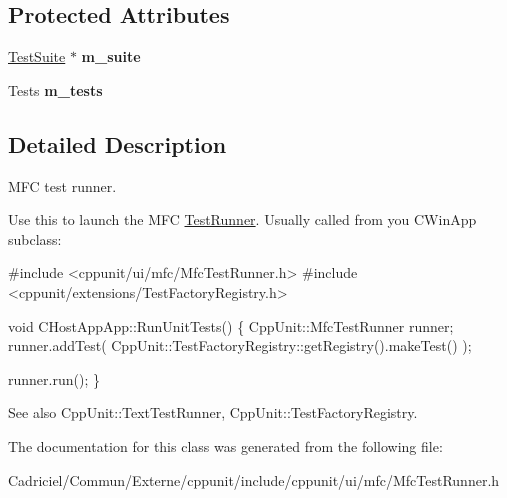 \subsection*{Protected Attributes}
\begin{DoxyCompactItemize}
\item 
\hyperlink{class_test_suite}{Test\+Suite} $\ast$ {\bfseries m\+\_\+suite}\hypertarget{class_mfc_test_runner_a7700f0b285e70f42f3e84b56be890658}{}\label{class_mfc_test_runner_a7700f0b285e70f42f3e84b56be890658}

\item 
Tests {\bfseries m\+\_\+tests}\hypertarget{class_mfc_test_runner_a041d453efb2f9e262676f1d68f1c22af}{}\label{class_mfc_test_runner_a041d453efb2f9e262676f1d68f1c22af}

\end{DoxyCompactItemize}


\subsection{Detailed Description}
M\+FC test runner.

Use this to launch the M\+FC \hyperlink{class_test_runner}{Test\+Runner}. Usually called from you C\+Win\+App subclass\+: 


\begin{DoxyCode}
\textcolor{preprocessor}{#include <cppunit/ui/mfc/MfcTestRunner.h>}
\textcolor{preprocessor}{#include <cppunit/extensions/TestFactoryRegistry.h>}

\textcolor{keywordtype}{void} 
CHostAppApp::RunUnitTests()
\{
  CppUnit::MfcTestRunner runner;
  runner.addTest( CppUnit::TestFactoryRegistry::getRegistry().makeTest() );

  runner.run();    
\}
\end{DoxyCode}
 \begin{DoxySeeAlso}{See also}
Cpp\+Unit\+::\+Text\+Test\+Runner, Cpp\+Unit\+::\+Test\+Factory\+Registry. 
\end{DoxySeeAlso}


The documentation for this class was generated from the following file\+:\begin{DoxyCompactItemize}
\item 
Cadriciel/\+Commun/\+Externe/cppunit/include/cppunit/ui/mfc/Mfc\+Test\+Runner.\+h\end{DoxyCompactItemize}
